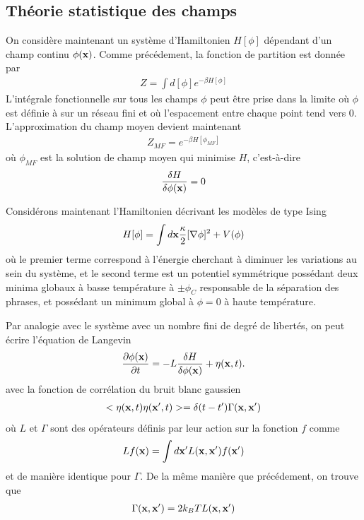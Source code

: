     \subsection{Théorie statistique des champs}

On considère maintenant un système d'Hamiltonien $H[\phi]$  dépendant d'un champ continu $\phi({\bf x})$. Comme précédement, la fonction de partition est donnée par 
\begin{align}
    Z = \int d[\phi] e^{-\beta H[\phi]}
\end{align}
L'intégrale fonctionnelle sur tous les champs $\phi$ peut être prise dans la limite où $\phi$ est définie à sur un réseau fini et où l'espacement entre chaque point tend vers $0$.
L'approximation du champ moyen devient maintenant
\begin{align}
Z _{MF}=  e^{-\beta H[\phi_{MF}]}
\end{align} 
où $\phi_{MF}$ est la solution de champ moyen qui minimise $H$, c'est-à-dire 
\begin{align}
    \frac{\delta H}{\delta\phi({\bf x})} = 0
\end{align}

Considérons maintenant l'Hamiltonien décrivant les modèles de type Ising
\begin{align}
    H[\phi] = \int d {\bf x}  \frac{\kappa}{2}[\nabla \phi]^2 + V(\phi)
    \label{hamil-mean-field}
\end{align}
où le premier terme correspond à l'énergie cherchant à diminuer les variations au sein du système, et le second terme est un potentiel symmétrique possédant deux minima globaux à basse température à $\pm \phi_C$ responsable de la séparation des phrases, et possédant un minimum global à $\phi = 0$ à haute température. 

Par analogie avec le système avec un nombre fini de degré de libertés, on peut écrire l'équation de Langevin 
\begin{align}
    \frac{\partial \phi({\bf x})}{\partial t}= -L \frac{\delta H}{\delta \phi({\bf x})} + \eta({\bf x},t).
\end{align}
avec la fonction de corrélation du bruit blanc gaussien
\begin{align}
    < \eta({\bf x},t)\eta({\bf x}',t)> =\delta(t-t')\Gamma({\bf x},{\bf x}')
\end{align}
où  $L$ et $\Gamma$ sont des opérateurs définis par leur action sur la fonction $f$ comme
\begin{align}
    L f({\bf x}) = \int d{\bf x}' L({\bf x},{\bf x}')f({\bf x}')
\end{align}
et de manière identique pour $\Gamma$.
De la même manière que précédement, on trouve que 
\begin{align} 
    \Gamma({\bf x},{\bf x}') =2 k_B T L({\bf x},{\bf x}')
\end{align}

